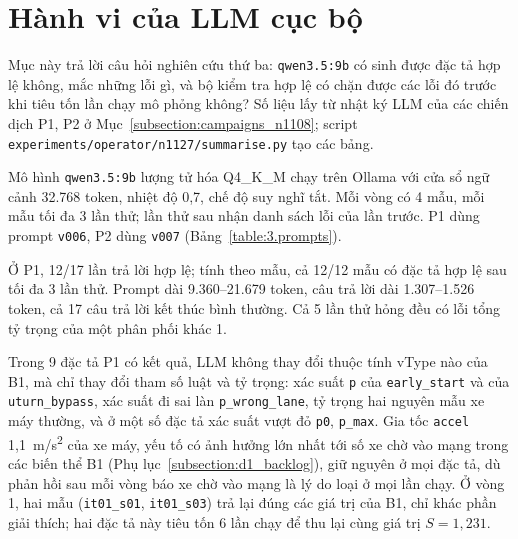 \documentclass[../main.tex]{subfiles}
\begin{document}
\section{Hành vi của LLM cục bộ}
\label{subsection:qwen_campaign}

Mục này trả lời câu hỏi nghiên cứu thứ ba: \texttt{qwen3.5:9b} có sinh được đặc tả hợp lệ không, mắc những lỗi gì, và bộ kiểm tra hợp lệ có chặn được các lỗi đó trước khi tiêu tốn lần chạy mô phỏng không? Số liệu lấy từ nhật ký LLM của các chiến dịch P1, P2 ở Mục~\ref{subsection:campaigns_n1108}; script \texttt{experiments/\allowbreak operator/\allowbreak n1127/\allowbreak summarise.py} tạo các bảng.

Mô hình \texttt{qwen3.5:9b} lượng tử hóa Q4\_K\_M chạy trên Ollama với cửa sổ ngữ cảnh 32.768 token, nhiệt độ 0,7, chế độ suy nghĩ tắt. Mỗi vòng có 4 mẫu, mỗi mẫu tối đa 3 lần thử; lần thử sau nhận danh sách lỗi của lần trước. P1 dùng prompt \texttt{v006}, P2 dùng \texttt{v007} (Bảng~\ref{table:3.prompts}).

Ở P1, 12/17 lần trả lời hợp lệ; tính theo mẫu, cả 12/12 mẫu có đặc tả hợp lệ sau tối đa 3 lần thử. Prompt dài 9.360--21.679 token, câu trả lời dài 1.307--1.526 token, cả 17 câu trả lời kết thúc bình thường. Cả 5 lần thử hỏng đều có lỗi tổng tỷ trọng của một phân phối khác 1.

Trong 9 đặc tả P1 có kết quả, LLM không thay đổi thuộc tính vType nào của B1, mà chỉ thay đổi tham số luật và tỷ trọng: xác suất \texttt{p} của \texttt{early\_start} và của \texttt{uturn\_bypass}, xác suất đi sai làn \texttt{p\_wrong\_lane}, tỷ trọng hai nguyên mẫu xe máy thường, và ở một số đặc tả xác suất vượt đỏ \texttt{p0}, \texttt{p\_max}. Gia tốc \texttt{accel} 1,1~m/s\textsuperscript{2} của xe máy, yếu tố có ảnh hưởng lớn nhất tới số xe chờ vào mạng trong các biến thể B1 (Phụ lục~\ref{subsection:d1_backlog}), giữ nguyên ở mọi đặc tả, dù phản hồi sau mỗi vòng báo xe chờ vào mạng là lý do loại ở mọi lần chạy. Ở vòng 1, hai mẫu (\texttt{it01\_s01}, \texttt{it01\_s03}) trả lại đúng các giá trị của B1, chỉ khác phần giải thích; hai đặc tả này tiêu tốn 6 lần chạy để thu lại cùng giá trị $S = 1{,}231$.
\end{document}
